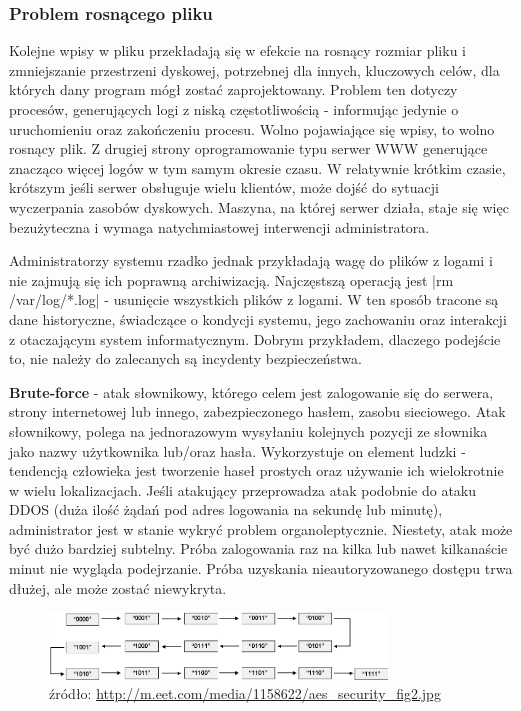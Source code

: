         \subsubsection{Problem rosnącego pliku}
        Kolejne wpisy w pliku przekładają się w efekcie na rosnący rozmiar pliku i zmniejszanie przestrzeni dyskowej,
        potrzebnej dla innych, kluczowych celów, dla których dany program mógł zostać zaprojektowany.
        Problem ten dotyczy procesów, generujących logi z niską częstotliwością - informując jedynie 
        o uruchomieniu oraz zakończeniu procesu. Wolno pojawiające się wpisy, to wolno rosnący plik. 
        Z drugiej strony oprogramowanie typu serwer WWW generujące znacząco więcej logów w tym samym okresie czasu.
        W relatywnie krótkim czasie, krótszym jeśli serwer obsługuje wielu klientów, może dojść do sytuacji wyczerpania zasobów
        dyskowych. Maszyna, na której serwer działa, staje się więc bezużyteczna i wymaga natychmiastowej interwencji
        administratora. 
        
        Administratorzy systemu rzadko jednak przykładają wagę do plików z logami i nie zajmują się ich poprawną archiwizacją.
        Najczęstszą operacją jest |rm /var/log/*.log| - usunięcie wszystkich plików z logami. W ten sposób
        tracone są dane historyczne, świadczące o kondycji systemu, jego zachowaniu oraz interakcji z otaczającym system informatycznym.
        Dobrym przykładem, dlaczego podejście to, nie należy do zalecanych są incydenty bezpieczeństwa. 
        
        \textbf{Brute-force}\cite{brute_force_attack} - atak słownikowy, którego celem jest zalogowanie się do serwera, strony internetowej lub innego, zabezpieczonego
        hasłem, zasobu sieciowego. Atak słownikowy, polega na jednorazowym wysyłaniu kolejnych pozycji ze słownika jako nazwy użytkownika lub/oraz
        hasła. Wykorzystuje on element ludzki - tendencją człowieka jest tworzenie haseł prostych oraz używanie ich wielokrotnie w wielu
        lokalizacjach. Jeśli atakujący przeprowadza atak podobnie do ataku DDOS (duża ilość żądań pod adres logowania na sekundę lub minutę),
        administrator jest w stanie wykryć problem organoleptycznie. Niestety, atak może być dużo bardziej subtelny. Próba zalogowania raz
        na kilka lub nawet kilkanaście minut nie wygląda podejrzanie. Próba uzyskania nieautoryzowanego dostępu trwa dłużej, ale może zostać niewykryta.
        
        \begin{figure}[H]
          \centering
          \includegraphics[width=0.80\textwidth]{images/brute_force}
          \caption[Schemat ataku brute-force]{
              źródło: \url{http://m.eet.com/media/1158622/aes_security_fig2.jpg}
            }
            \label{logs:collecting:brute_force}
        \end{figure}
        
